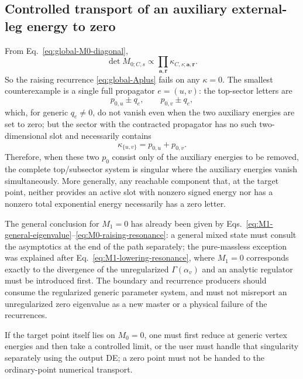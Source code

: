 \documentclass[11pt,a4paper]{article}
\begin{document}
\subsection{Controlled transport of an auxiliary external-leg energy to zero}

From Eq.~\eqref{eq:global-M0-diagonal},
\begin{equation}
 \det M_{0;C,s}\propto
 \prod_{\bm a,\bm r}\kappa_{C,s;\bm a,\bm r}.
 \label{eq:M0-determinant-letters}
\end{equation}
So the raising recurrence \eqref{eq:global-Aplus} fails on any $\kappa=0$. The smallest counterexample is a single full propagator $e=(u,v)$: the top-sector letters are
\begin{equation}
 p_{0,u}\pm q_e,
 \qquad
 p_{0,v}\pm q_e,
 \end{equation}
which, for generic $q_e\neq0$, do not vanish even when the two auxiliary energies are set to zero; but the sector with the contracted propagator has no such two-dimensional slot and necessarily contains
\begin{equation}
 \kappa_{\{u,v\}}=p_{0,u}+p_{0,v}.
 \label{eq:contracted-zero-letter}
\end{equation}
Therefore, when these two $p_0$ consist only of the auxiliary energies to be removed, the complete top/subsector system is singular where the auxiliary energies vanish simultaneously. More generally, any reachable component that, at the target point, neither provides an active slot with nonzero signed energy nor has a nonzero total exponential energy necessarily has a zero letter.

The general conclusion for $M_1=0$ has already been given by Eqs.~\eqref{eq:M1-general-eigenvalue}--\eqref{eq:M0-raising-resonance}: a general mixed state must consult the asymptotics at the end of the path separately; the pure-massless exception was explained after Eq.~\eqref{eq:M1-lowering-resonance}, where $M_1=0$ corresponds exactly to the divergence of the unregularized $\Gamma(\alpha_v)$ and an analytic regulator must be introduced first. The boundary and recurrence producers should consume the regularized generic parameter system, and must not misreport an unregularized zero eigenvalue as a new master or a physical failure of the recurrences.

If the target point itself lies on $M_0=0$, one must first reduce at generic vertex energies and then take a controlled limit, or the user must handle that singularity separately using the output DE; a zero point must not be handed to the ordinary-point numerical transport.
\end{document}
